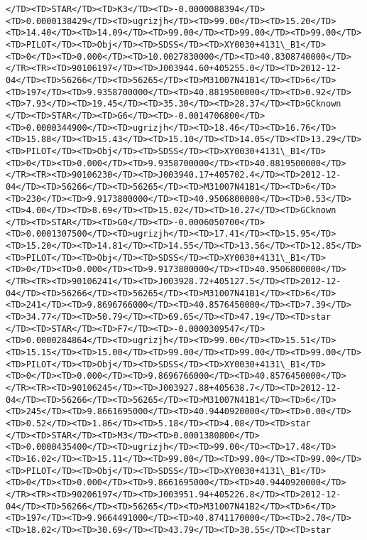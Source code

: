 \documentclass[11pt]{article}
\begin{document}
\begin{Verbatim}[commandchars=\\\{\}]
</TD><TD>STAR</TD><TD>K3</TD><TD>-0.0000088394</TD><TD>0.0000138429</TD><TD>ugrizjh</TD><TD>99.00</TD><TD>15.20</TD><TD>14.40</TD><TD>14.09</TD><TD>99.00</TD><TD>99.00</TD><TD>99.00</TD><TD>PILOT</TD><TD>Obj</TD><TD>SDSS</TD><TD>XY0030+4131\_B1</TD><TD>0</TD><TD>0.000</TD><TD>10.0027830000</TD><TD>40.8308740000</TD></TR><TR><TD>90106197</TD><TD>J003944.60+405255.0</TD><TD>2012-12-04</TD><TD>56266</TD><TD>56265</TD><TD>M31007N41B1</TD><TD>6</TD><TD>197</TD><TD>9.9358700000</TD><TD>40.8819500000</TD><TD>0.92</TD><TD>7.93</TD><TD>19.45</TD><TD>35.30</TD><TD>28.37</TD><TD>GCknown   </TD><TD>STAR</TD><TD>G6</TD><TD>-0.0014706800</TD><TD>0.0000344900</TD><TD>ugrizjh</TD><TD>18.46</TD><TD>16.76</TD><TD>15.88</TD><TD>15.43</TD><TD>15.10</TD><TD>14.05</TD><TD>13.29</TD><TD>PILOT</TD><TD>Obj</TD><TD>SDSS</TD><TD>XY0030+4131\_B1</TD><TD>0</TD><TD>0.000</TD><TD>9.9358700000</TD><TD>40.8819500000</TD></TR><TR><TD>90106230</TD><TD>J003940.17+405702.4</TD><TD>2012-12-04</TD><TD>56266</TD><TD>56265</TD><TD>M31007N41B1</TD><TD>6</TD><TD>230</TD><TD>9.9173800000</TD><TD>40.9506800000</TD><TD>0.53</TD><TD>4.00</TD><TD>8.69</TD><TD>15.02</TD><TD>10.27</TD><TD>GCknown   </TD><TD>STAR</TD><TD>G0</TD><TD>-0.0006050700</TD><TD>0.0001307500</TD><TD>ugrizjh</TD><TD>17.41</TD><TD>15.95</TD><TD>15.20</TD><TD>14.81</TD><TD>14.55</TD><TD>13.56</TD><TD>12.85</TD><TD>PILOT</TD><TD>Obj</TD><TD>SDSS</TD><TD>XY0030+4131\_B1</TD><TD>0</TD><TD>0.000</TD><TD>9.9173800000</TD><TD>40.9506800000</TD></TR><TR><TD>90106241</TD><TD>J003928.72+405127.5</TD><TD>2012-12-04</TD><TD>56266</TD><TD>56265</TD><TD>M31007N41B1</TD><TD>6</TD><TD>241</TD><TD>9.8696766000</TD><TD>40.8576450000</TD><TD>7.39</TD><TD>34.77</TD><TD>50.79</TD><TD>69.65</TD><TD>47.19</TD><TD>star      </TD><TD>STAR</TD><TD>F7</TD><TD>-0.0000309547</TD><TD>0.0000284864</TD><TD>ugrizjh</TD><TD>99.00</TD><TD>15.51</TD><TD>15.15</TD><TD>15.00</TD><TD>99.00</TD><TD>99.00</TD><TD>99.00</TD><TD>PILOT</TD><TD>Obj</TD><TD>SDSS</TD><TD>XY0030+4131\_B1</TD><TD>0</TD><TD>0.000</TD><TD>9.8696766000</TD><TD>40.8576450000</TD></TR><TR><TD>90106245</TD><TD>J003927.88+405638.7</TD><TD>2012-12-04</TD><TD>56266</TD><TD>56265</TD><TD>M31007N41B1</TD><TD>6</TD><TD>245</TD><TD>9.8661695000</TD><TD>40.9440920000</TD><TD>0.00</TD><TD>0.52</TD><TD>1.86</TD><TD>5.18</TD><TD>4.08</TD><TD>star      </TD><TD>STAR</TD><TD>M3</TD><TD>0.0001380800</TD><TD>0.0000435400</TD><TD>ugrizjh</TD><TD>99.00</TD><TD>17.48</TD><TD>16.02</TD><TD>15.11</TD><TD>99.00</TD><TD>99.00</TD><TD>99.00</TD><TD>PILOT</TD><TD>Obj</TD><TD>SDSS</TD><TD>XY0030+4131\_B1</TD><TD>0</TD><TD>0.000</TD><TD>9.8661695000</TD><TD>40.9440920000</TD></TR><TR><TD>90206197</TD><TD>J003951.94+405226.8</TD><TD>2012-12-04</TD><TD>56266</TD><TD>56265</TD><TD>M31007N41B2</TD><TD>6</TD><TD>197</TD><TD>9.9664491000</TD><TD>40.8741170000</TD><TD>2.70</TD><TD>18.02</TD><TD>30.69</TD><TD>43.79</TD><TD>30.55</TD><TD>star      
\end{Verbatim}
\end{document}
